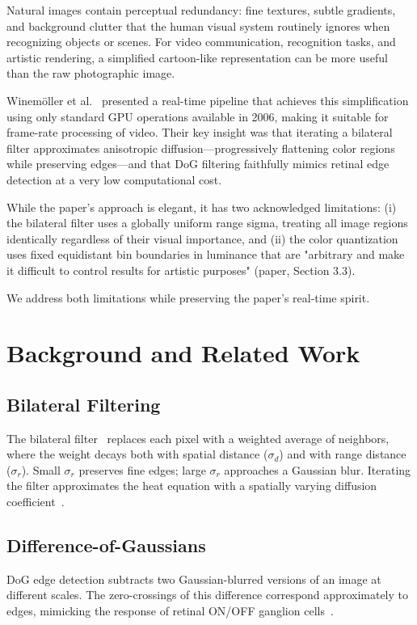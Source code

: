 \documentclass[conference]{IEEEtran}
\begin{document}
Natural images contain perceptual redundancy: fine textures, subtle gradients, and background clutter that the human visual system routinely ignores when recognizing objects or scenes. For video communication, recognition tasks, and artistic rendering, a simplified cartoon-like representation can be more useful than the raw photographic image.

Winemöller et al.~\cite{winemoller2006} presented a real-time pipeline that achieves this simplification using only standard GPU operations available in 2006, making it suitable for frame-rate processing of video. Their key insight was that iterating a bilateral filter approximates anisotropic diffusion—progressively flattening color regions while preserving edges—and that DoG filtering faithfully mimics retinal edge detection at a very low computational cost.

While the paper's approach is elegant, it has two acknowledged limitations: (i) the bilateral filter uses a globally uniform range sigma, treating all image regions identically regardless of their visual importance, and (ii) the color quantization uses fixed equidistant bin boundaries in luminance that are "arbitrary and make it difficult to control results for artistic purposes" (paper, Section 3.3).

We address both limitations while preserving the paper's real-time spirit.

\section{Background and Related Work}

\subsection{Bilateral Filtering}
The bilateral filter~\cite{tomasi1998} replaces each pixel with a weighted average of neighbors, where the weight decays both with spatial distance ($\sigma_d$) and with range distance ($\sigma_r$). Small $\sigma_r$ preserves fine edges; large $\sigma_r$ approaches a Gaussian blur. Iterating the filter approximates the heat equation with a spatially varying diffusion coefficient~\cite{winemoller2006}.

\subsection{Difference-of-Gaussians}
DoG edge detection subtracts two Gaussian-blurred versions of an image at different scales. The zero-crossings of this difference correspond approximately to edges, mimicking the response of retinal ON/OFF ganglion cells~\cite{marr1980}.
\end{document}
